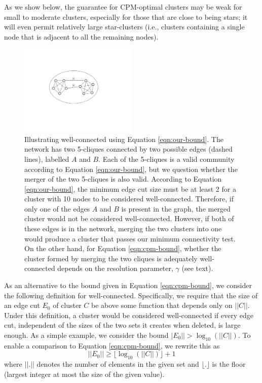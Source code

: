 \documentclass[11pt]{article}   	%
\begin{document}
As we show below, the guarantee for CPM-optimal clusters may be weak for small to moderate clusters, especially for those that are close to being stars; it will even permit relatively
large star-clusters (i.e., clusters containing a single node that is adjacent to all the remaining nodes).

\begin{figure}[h!]
\centering
\includegraphics[width=0.5\textwidth]{figs/fig_clique.pdf}
\caption{Illustrating well-connected using Equation \ref{eqn:our-bound}. The network has two 5-cliques connected by two possible edges (dashed lines), labelled $A$ and $B$.
Each of the 5-cliques is a valid community according to Equation \ref{eqn:our-bound}, but we question whether the merger of the two 5-cliques is also valid.
According to Equation \ref{eqn:our-bound}, the minimum edge cut size  must be at least 2 for a cluster with 10 nodes to be considered well-connected.
Therefore, if only one of the edges $A$ and $B$ is present in the graph, the merged cluster  would not  be considered well-connected.
However, if both of these edges is in the network, merging the two clusters into one would produce a cluster that passes our minimum connectivity test.
On the other hand, for Equation \ref{eqn:cpm-bound}, whether the cluster formed by merging the two cliques is adequately well-connected depends on the resolution parameter, $\gamma$ (see text).}
\label{fig:2cliques}
\end{figure}

As an alternative to the bound given in Equation \ref{eqn:cpm-bound},  we consider the
following definition for well-connected.
Specifically, we require that the size of an edge cut  $E_0$  of cluster $C$ be above some function that depends only on $||C||$.
Under this definition, a cluster would be considered well-connected if every edge cut, independent of the sizes of the
two sets it creates when deleted, is large enough.
As a simple example, we consider the bound $|E_0|| > \log_{10}(||C||)$.  To enable a comparison to Equation \ref{eqn:cpm-bound}, we rewrite this  as
\begin{equation}
  ||E_0|| \geq  \lfloor \log_{10}(||C||) \rfloor +1
  \label{eqn:our-bound}
  \end{equation}
where $||.||$ denotes the number of elements in the given set and
$\lfloor . \rfloor$ is the floor (largest integer at most the size of the given value).
\end{document}
